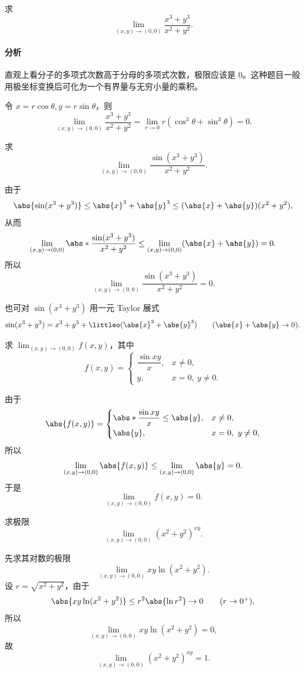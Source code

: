 \begin{xexample}[18.1.1]
求
\[
  \lim_{(x,y)\to(0,0)}\frac{x^3+y^3}{x^2+y^2}.
\]
\end{xexample}
\paragraph{分析}
直观上看分子的多项式次数高于分母的多项式次数，极限应该是 0。这种题目一般用极坐标变换后可化为一个有界量与无穷小量的乘积。
\begin{xsolution}
令 $x=r\cos\theta,y=r\sin\theta$，则
\[
  \lim_{(x,y)\to(0,0)}\frac{x^3+y^3}{x^2+y^2}
  =\lim_{r\to0}r(\cos^3\theta+\sin^3\theta)=0.
\]
\end{xsolution}

\begin{xexample}[18.1.2]
求
\[
  \lim_{(x,y)\to(0,0)}\frac{\sin(x^3+y^3)}{x^2+y^2}.
\]
\end{xexample}
\begin{xsolution}
由于
\[
  \abs{\sin(x^3+y^3)}\le \abs{x}^3+\abs{y}^3
  \le (\abs{x}+\abs{y})(x^2+y^2),
\]
从而
\[
  \lim_{(x,y)\to(0,0)}
  \abs*{\frac{\sin(x^3+y^3)}{x^2+y^2}}
  \le
  \lim_{(x,y)\to(0,0)}(\abs{x}+\abs{y})=0.
\]
所以
\[
  \lim_{(x,y)\to(0,0)}\frac{\sin(x^3+y^3)}{x^2+y^2}=0.
\]
\end{xsolution}
\begin{xremark}
也可对 $\sin(x^3+y^3)$ 用一元 Taylor 展式
\[
  \sin(x^3+y^3)=x^3+y^3+\littleo(\abs{x}^3+\abs{y}^3)
  \qquad(\abs{x}+\abs{y}\to0).
\]
\end{xremark}

\begin{xexample}[18.1.3]
求 $\displaystyle\lim_{(x,y)\to(0,0)}f(x,y)$，其中
\[
  f(x,y)=
  \begin{cases}
    \dfrac{\sin xy}{x}, & x\ne0,\\[4pt]
    y, & x=0,\ y\ne0.
  \end{cases}
\]
\end{xexample}
\begin{xsolution}
由于
\[
  \abs{f(x,y)}=
  \begin{cases}
    \abs*{\dfrac{\sin xy}{x}}\le\abs{y}, & x\ne0,\\[4pt]
    \abs{y}, & x=0,\ y\ne0,
  \end{cases}
\]
所以
\[
  \lim_{(x,y)\to(0,0)}\abs{f(x,y)}
  \le \lim_{(x,y)\to(0,0)}\abs{y}=0.
\]
于是
\[
  \lim_{(x,y)\to(0,0)}f(x,y)=0.
\]
\end{xsolution}

\begin{xexample}[18.1.4]
求极限
\[
  \lim_{(x,y)\to(0,0)}(x^2+y^2)^{xy}.
\]
\end{xexample}
\begin{xsolution}
先求其对数的极限
\[
  \lim_{(x,y)\to(0,0)}xy\ln(x^2+y^2).
\]
设 $r=\sqrt{x^2+y^2}$，由于
\[
  \abs{xy\ln(x^2+y^2)}\le r^2\abs{\ln r^2}\to0
  \qquad(r\to0^+),
\]
所以
\[
  \lim_{(x,y)\to(0,0)}xy\ln(x^2+y^2)=0,
\]
故
\[
  \lim_{(x,y)\to(0,0)}(x^2+y^2)^{xy}=1.
\]
\end{xsolution}

